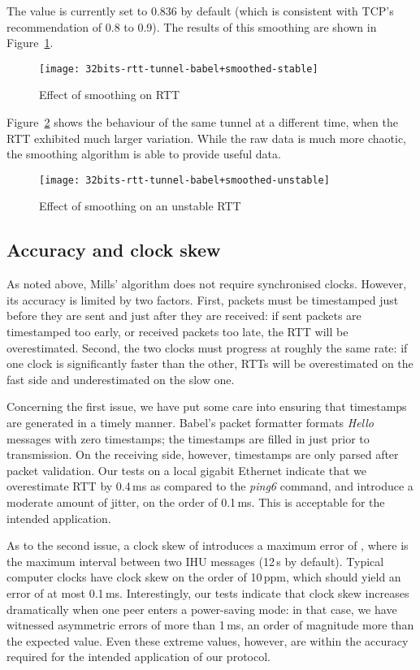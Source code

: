 \documentclass[conference,letterpaper]{IEEEtran}
\begin{document}
The value  is currently set to 0.836 by default (which is
consistent with TCP's recommendation of 0.8 to 0.9).  The results of
this smoothing are shown in Figure~\ref{fig:rtt-paris-tokyo-smoothed}.

\begin{figure}[htb]
\centering
\texttt{[image: 32bits-rtt-tunnel-babel+smoothed-stable]}
\caption{Effect of smoothing on RTT}\label{fig:rtt-paris-tokyo-smoothed}
\end{figure}

Figure~\ref{fig:rtt-paris-tokyo-unstable} shows the behaviour of the
same tunnel at a different time, when the RTT exhibited much larger
variation.  While the raw data is much more chaotic, the smoothing
algorithm is able to provide useful data.

\begin{figure}[htb]
\centering
\texttt{[image: 32bits-rtt-tunnel-babel+smoothed-unstable]}
\caption{Effect of smoothing on an unstable RTT}\label{fig:rtt-paris-tokyo-unstable}
\end{figure}

\subsection{Accuracy and clock skew}

As noted above, Mills' algorithm does not require synchronised clocks.
However, its accuracy is limited by two factors.  First, packets must
be timestamped just before they are sent and just after they are
received: if sent packets are timestamped too early, or received
packets too late, the RTT will be overestimated.  Second, the two
clocks must progress at roughly the same rate: if one clock is
significantly faster than the other, RTTs will be overestimated on the
fast side and underestimated on the slow one.

Concerning the first issue, we have put some care into ensuring that
timestamps are generated in a timely manner.  Babel's packet formatter
formats \emph{Hello} messages with zero timestamps; the timestamps are
filled in just prior to transmission.  On the receiving side, however,
timestamps are only parsed after packet validation.  Our tests on
a local gigabit Ethernet indicate that we overestimate RTT by 0.4\,ms
as compared to the \emph{ping6} command, and introduce a moderate
amount of jitter, on the order of 0.1\,ms.  This is acceptable for the
intended application.

As to the second issue, a clock skew of  introduces a maximum
error of , where  is the maximum interval
between two IHU messages (12\,s by default).  Typical computer clocks
have clock skew on the order of 10\,ppm, which should yield an error
of at most 0.1\,ms.  Interestingly, our tests indicate that clock skew
increases dramatically when one peer enters a power-saving mode: in
that case, we have witnessed asymmetric errors of more than 1\,ms, an
order of magnitude more than the expected value.  Even these extreme
values, however, are within the accuracy required for the intended
application of our protocol.
\end{document}

